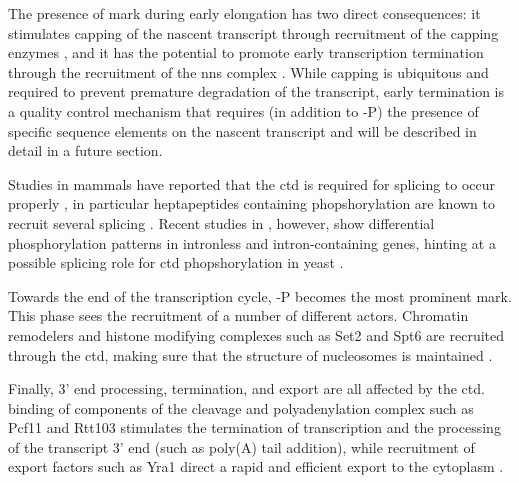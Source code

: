 The presence of \serf{} mark during early elongation has two direct consequences: it stimulates capping of the nascent transcript through recruitment of the capping enzymes \cite{mccracken:1997:5capping}, and it has the potential to promote early transcription termination through the recruitment of the \gls{nns} complex \cite{vasiljeva:2008:nrd1nab3sen1}.
While capping is ubiquitous and required to prevent premature degradation of the transcript, early termination is a quality control mechanism that requires (in addition to \serf{}-P) the presence of specific sequence elements on the nascent transcript and will be described in detail in a future section.

Studies in mammals have reported that the \gls{ctd} is required for splicing to occur properly \cite{mccracken:1997:cterminal}, in particular heptapeptides containing \sert{} phopshorylation are known to recruit several splicing \cite{factors gu:2013:ctd}. Recent studies in \cer{}, however, show differential phosphorylation patterns in intronless and intron-containing genes, hinting at a possible splicing role for \gls{ctd} phopshorylation in yeast \cite{milligan:2016:strandspecific}.

Towards the end of the transcription cycle, \sert{}-P becomes the most prominent mark. 
This phase sees the recruitment of a number of different actors.
Chromatin remodelers and histone modifying complexes such as Set2 and Spt6 are recruited through the \gls{ctd}, making sure that the structure of nucleosomes is maintained \cite{burugula:2014:histone}.

Finally, 3' end processing, termination, and export are all affected by the \gls{ctd}. binding of components of the cleavage and polyadenylation complex such as Pcf11 and Rtt103 stimulates the termination of transcription and the processing of the transcript 3' end (such as poly(A) tail addition), while recruitment of export factors such as Yra1 direct a rapid and efficient export to the cytoplasm \cite{mackellar:2011:cotranscriptional}.
 


\clearpage